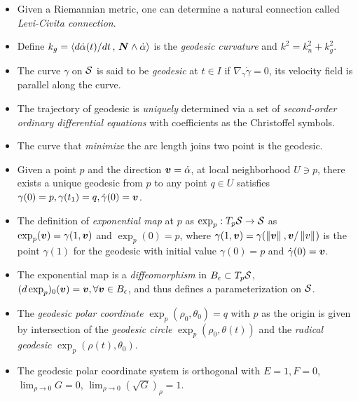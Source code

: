 \documentclass[11pt]{article}
\begin{document}
\begin{itemize}
\item Given a Riemannian metric, one can determine a natural connection called \emph{Levi-Civita connection}. \\[10pt]

\item Define $k_{g} = \left\langle d\dot{\alpha}(t)/dt\,,\, \boldsymbol{N} \wedge \dot{\alpha} \right\rangle$ is the \emph{geodesic curvature} and 
$k^{2} = k_{n}^{2} + k_{g}^{2}.$

\item The curve $\gamma$ on ${\mathcal S}$ is said to be \emph{geodesic} at $t\in I$ if $\nabla_{\dot{\gamma}}\dot{\gamma} = 0$, its velocity field is parallel along the curve.

\item The trajectory of geodesic is \emph{uniquely} determined via a set of \emph{second-order ordinary differential equations} with coefficients as the Christoffel symbols. 

\item The curve that \emph{minimize} the arc length joins two point is the geodesic.\\[10pt]

\item Given a point $p$ and the direction $\boldsymbol{v} = \dot{\alpha}$, at local neighborhood $U\ni p$, there exists a unique geodesic from $p$ to any point $q\in U$ satisfies $\gamma(0)=p, \gamma(t_{1}) = q, \dot{\gamma}(0) = \boldsymbol{v}$.

\item The definition of \emph{exponential map} at $p$ as $\exp_{p}: T_{p}{\mathcal S} \rightarrow {\mathcal S}$ as $\exp_{p}(\boldsymbol{v}) = \gamma(1,\boldsymbol{v})$ and $\exp_{p}(0) = p$, where $\gamma(1,\boldsymbol{v}) = \gamma(\left\|\boldsymbol{v}\right\|_{}, \boldsymbol{v}/\left\|v\right\|_{})$ is the point $\gamma(1)$ for the geodesic with initial value $\gamma(0) = p$ and $\dot{\gamma}(0) = \boldsymbol{v}$.

\item The exponential map is a \emph{diffeomorphism} in $B_{\epsilon} \subset  T_{p}{\mathcal S}$, $(d\exp_{p})_{0}(\boldsymbol{v}) = \boldsymbol{v}, \forall \boldsymbol{v}\in B_{\epsilon}$, and thus defines a parameterization on ${\mathcal S}$.

\item The \emph{geodesic polar coordinate} $\exp_{p}(\rho_{0}, \theta_{0}) = q$ with $p$ as the origin is given by intersection of the  \emph{geodesic circle} $\exp_{p}(\rho_{0}, \theta(t))$ and the \emph{radical geodesic} $\exp_{p}(\rho(t), \theta_{0})$.

\item The geodesic polar coordinate system is orthogonal with $E=1,F=0$, $\lim_{\rho\rightarrow 0}G = 0$, $\lim_{\rho\rightarrow 0}(\sqrt{G})_{\rho} = 1 $.
\end{itemize}
\end{document}
